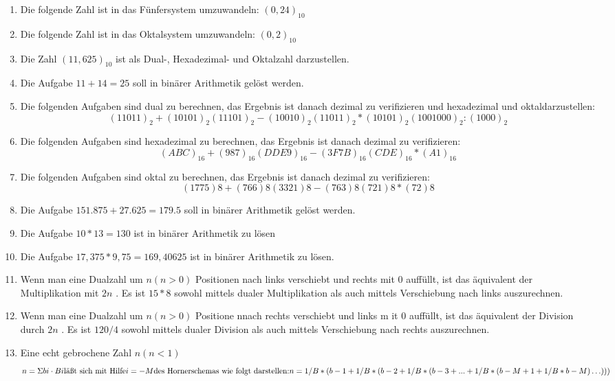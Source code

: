 \documentclass[12pt,a4paper]{scrreprt}
\begin{document}
\begin{enumerate}
\item Die folgende Zahl ist in das Fünfersystem umzuwandeln: $(0,24)_10$

\item Die folgende Zahl ist in das Oktalsystem umzuwandeln: $(0,2)_10$

\item Die Zahl $(11,625)_10$ ist als Dual-, Hexadezimal- und Oktalzahl darzustellen.

\item Die Aufgabe $11+14=25$ soll in binärer Arithmetik gelöst werden.

\item Die folgenden Aufgaben sind dual zu berechnen, das Ergebnis ist danach dezimal zu verifizieren und hexadezimal und oktaldarzustellen:
\[
(11011)_2 + (10101)_2
(11101)_2 - (10010)_2
(11011)_2 * (10101)_2
(1001000)_2 : (1000)_2
\]
\item Die folgenden Aufgaben sind hexadezimal zu berechnen, das Ergebnis ist danach dezimal zu verifizieren:
\[
(ABC)_16 + (987)_16
(DDE9)_16 - (3F7B)_16
(CDE)_16 * (A1)_16
\]
\item Die folgenden Aufgaben sind oktal zu berechnen, das Ergebnis ist danach dezimal zu verifizieren:
\[
(1775) 8 + (766) 8
(3321) 8 - (763) 8
(721) 8 * (72) 8
\]
\item Die Aufgabe $151.875 + 27.625 = 179.5$ soll in binärer Arithmetik gelöst werden.

\item Die Aufgabe $10*13=130$ ist in binärer Arithmetik zu lösen

\item Die Aufgabe $17,375*9,75 = 169,40625$ ist in binärer Arithmetik zu lösen.

\item Wenn man eine Dualzahl um $n (n>0)$ Positionen nach links verschiebt und rechts mit $0$ auffüllt, ist das äquivalent der Multiplikation mit $2 n$ . Es ist $15*8$ sowohl mittels dualer Multiplikation als auch mittels Verschiebung nach links auszurechnen.

\item Wenn man eine Dualzahl um $n (n>0)$ Positione nnach rechts verschiebt und links m it $0$ auffüllt, ist das äquivalent der Division durch $2n$ . Es ist $1 2 0 / 4$ sowohl mittels dualer Division als auch mittels Verschiebung nach rechts auszurechnen.

\item Eine echt gebrochene Zahl $n (n<1)$
\[
n =
\Sigma
bi \cdot B
i
\text{läßt sich mit Hilfe}
i = -M
\text{des Hornerschemas wie folgt darstellen:} \\
n = 1/B*(b -1 + 1 / B * ( b -2 + 1/B*(b -3 + ... + 1/B*(b -M +1 + 1 / B * b -M ) \ldots)))
\]


\end{enumerate}
\end{document}
